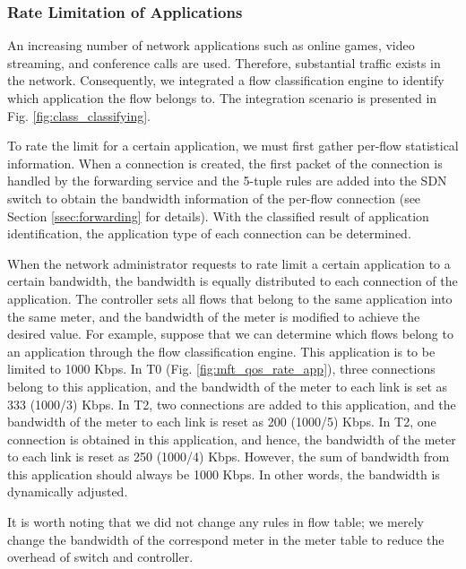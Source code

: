 \subsubsection{Rate Limitation of Applications}
An increasing number of network applications such as online games, video streaming, and conference calls are used. Therefore, substantial traffic exists in the network. Consequently, we integrated a flow classification engine to identify which application the flow belongs to. The integration scenario is presented in Fig. \ref{fig:class_classifying}.

To rate the limit for a certain application, we must first gather per-flow statistical information. When a connection is created, the first packet of the connection is handled by the forwarding service and the 5-tuple rules are added into the SDN switch to obtain the bandwidth information of the per-flow connection (see Section \ref{ssec:forwarding} for details). With the classified result of application identification, the application type of each connection can be determined.

When the network administrator requests to rate limit a certain application to a certain bandwidth, the bandwidth is equally distributed to each connection of the application. The controller sets all flows that belong to the same application into the same meter, and the bandwidth of the meter is modified to achieve the desired value. For example, suppose that we can determine which flows belong to an application through the flow classification engine. This application is to be limited to 1000 Kbps. In T0 (Fig. \ref{fig:mft_qos_rate_app}), three connections belong to this application, and the bandwidth of the meter to each link is set as 333 (1000/3) Kbps. In T2, two connections are added to this application, and the bandwidth of the meter to each link is reset as 200 (1000/5) Kbps. In T2, one connection is obtained in this application, and hence, the bandwidth of the meter to each link is reset as 250 (1000/4) Kbps. However, the sum of bandwidth from this application should always be 1000 Kbps. In other words, the bandwidth is dynamically adjusted.

It is worth noting that we did not change any rules in flow table; we merely change the bandwidth of the correspond meter in the meter table to reduce the overhead of switch and controller.

